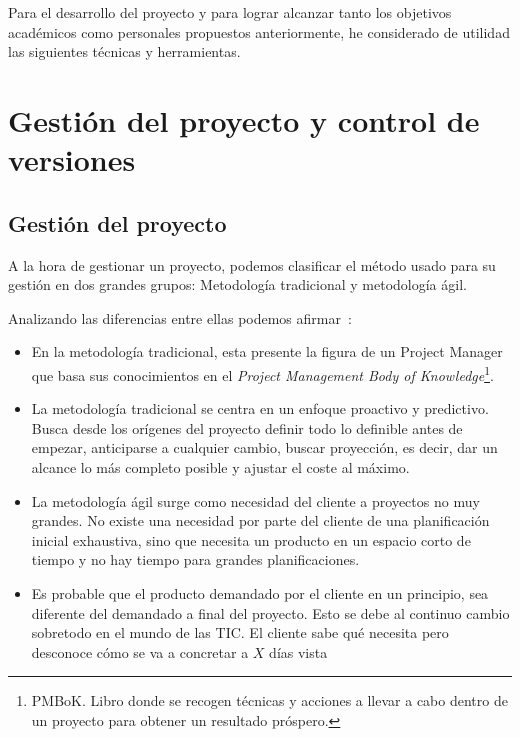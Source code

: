 
Para el desarrollo del proyecto y para lograr alcanzar tanto los objetivos académicos como personales propuestos anteriormente, he considerado de utilidad las siguientes técnicas y herramientas.

\section{Gestión del proyecto y control de versiones}

\subsection{Gestión del proyecto}

A la hora de gestionar un proyecto, podemos clasificar el método usado para su gestión en dos grandes grupos: Metodología tradicional y metodología ágil.

Analizando las diferencias entre ellas podemos afirmar~\cite{web:diferencias-metodologias}:

\begin{itemize}
	\item En la metodología tradicional, esta presente la figura de un Project Manager que basa sus conocimientos en el \textit{Project Management Body of Knowledge}\footnote{PMBoK. Libro donde se recogen técnicas y acciones a llevar a cabo dentro de un proyecto para obtener un resultado próspero.}.
	\item La metodología tradicional se centra en un enfoque proactivo y predictivo. Busca desde los orígenes del proyecto definir todo lo definible antes de empezar, anticiparse a cualquier cambio, buscar proyección, es decir, dar un alcance lo más completo posible y ajustar el coste al máximo.
	
	\item La metodología ágil surge como necesidad del cliente a proyectos no muy grandes. No existe una necesidad por parte del cliente de una planificación inicial exhaustiva, sino que necesita un producto en un espacio corto de tiempo y no hay tiempo para grandes planificaciones.
	\item Es probable que el producto demandado por el cliente en un principio, sea diferente del demandado a final del proyecto. Esto se debe al continuo cambio sobretodo en el mundo de las TIC. El cliente sabe qué necesita pero desconoce cómo se va a concretar a $X$ días vista
\end{itemize}

